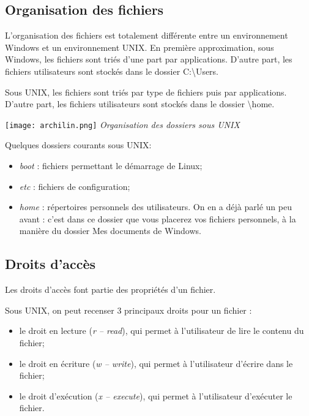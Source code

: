 \subsection{Organisation des fichiers}
L'organisation des fichiers est totalement différente entre un environnement Windows et un environnement UNIX. 
En première approximation, sous Windows, les fichiers sont triés d'une part par applications. D'autre part, les fichiers utilisateurs sont stockés dans le dossier C:\textbackslash Users.

Sous UNIX, les fichiers sont triés par type de fichiers puis par applications. D'autre part, les fichiers utilisateurs sont stockés dans le dossier \textbackslash home.


\begin{minipage}[c]{.49\linewidth}
\begin{center}
\texttt{[image: archilin.png]}
\textit{Organisation des dossiers sous UNIX}
\end{center}
\end{minipage} \hfill
\begin{minipage}[c]{.49\linewidth}

Quelques dossiers courants sous UNIX:
\begin{itemize}
\item \textit{boot} : fichiers permettant le démarrage de Linux;
\item \textit{etc} : fichiers de configuration;
\item \textit{home} : répertoires personnels des utilisateurs. On en a déjà parlé un peu avant : c'est dans ce dossier que vous placerez vos fichiers personnels, à la manière du dossier Mes documents de Windows.
\end{itemize}
\end{minipage}

\subsection{Droits d’accès}

Les droits d'accès font partie des propriétés d'un fichier. 

Sous UNIX, on peut recenser 3 principaux droits pour un fichier : 
\begin{itemize}
\item le droit en lecture (\textit{r -- read}), qui permet à l'utilisateur de lire le contenu du fichier;
\item le droit en écriture (\textit{w -- write}), qui permet à l'utilisateur d'écrire dans le fichier;
\item le droit d'exécution (\textit{x -- execute}), qui permet à l'utilisateur d'exécuter le fichier.
\end{itemize}

